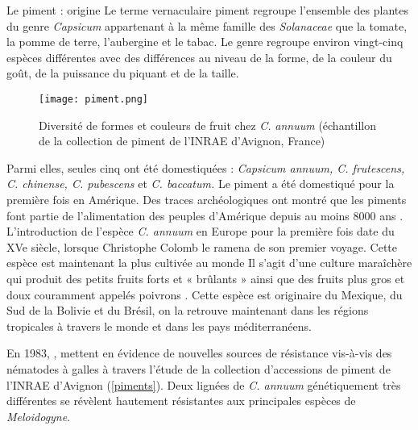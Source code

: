 \begin{encadre2}{Le piment : origine}
\label{pim}Le terme vernaculaire \og piment \fg{} regroupe l’ensemble des plantes du genre \textit{Capsicum} appartenant à la même famille des \textit{Solanaceae} que la tomate, la pomme de terre, l’aubergine et le tabac. Le genre regroupe environ vingt-cinq espèces différentes avec des différences au niveau de la forme, de la couleur du goût, de la puissance du piquant et de la taille.

\parbox{7cm}{%
\begin{figure}[H]
\hspace{3.5cm}
\texttt{[image: piment.png]}	

 \begin{minipage}{0.96\linewidth}
 \caption[Collection de piments de l’INRAE d’Avignon, France (Photos Inrae sophia Antipolis)]{Diversité 
      de formes et couleurs de fruit chez \textit{C.}  \textit{annuum} (échantillon de la collection de 
  piment de l’INRAE d’Avignon, France) }
 \label{piments}
 \end{minipage}	
\end{figure}
}
Parmi elles, seules cinq ont été domestiquées :
\textit{Capsicum annuum, C. frutescens, C. chinense, C. pubescens} et \textit{C. baccatum.}
Le piment a été domestiqué pour la première fois en Amérique.
Des traces archéologiques ont montré que  les piments font partie de l'alimentation des peuples d'Amérique depuis au moins 8000 ans \citep{Aguilar-Melendez2009}. L'introduction de l'espèce \textit{C. annuum} en Europe pour la première fois date du XVe siècle, lorsque Christophe Colomb le ramena de son
premier voyage. Cette espèce est maintenant la plus cultivée au monde 
Il s’agit d’une culture maraîchère qui produit des petits fruits forts et « brûlants »
ainsi que des fruits plus gros et doux couramment appelés \og poivrons \fg . Cette espèce est originaire
du Mexique, du Sud de la Bolivie et du Brésil, on la retrouve maintenant dans les régions tropicales à travers le monde et dans les pays méditerranéens.
\end{encadre2}	


	En 1983, \citet{Hendy1983}, mettent en évidence de nouvelles sources de résistance vis-à-vis des nématodes 
à galles  à travers l’étude de la collection d’accessions de piment de l’INRAE
d’Avignon (\autoref{piments}). Deux lignées de \textit{C. annuum} génétiquement très différentes se révèlent hautement résistantes aux  principales espèces de \textit{Meloidogyne}.

